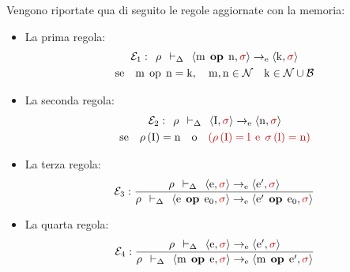 \documentclass[a4paper]{article}
\begin{document}
 	Vengono riportate qua di seguito le regole aggiornate con la memoria:
 	\begin{itemize}
 		\item La prima regola:
 		\begin{gather*}
 			\mathcal{E}_{1}: \:\: \rho \:\: \vdash_{\Delta} \:\: \left\langle \mathrm{m} \:\: \mathbf{op} \:\: \mathrm{n}, \textcolor{Red3}{\sigma} \right\rangle \rightarrow_{\mathrm{e}} \left\langle \mathrm{k}, \textcolor{Red3}{\sigma} \right\rangle \\
 			\mathrm{se} \hspace{1em} \mathrm{m} \:\: \mathrm{op} \:\: \mathrm{n} = \mathrm{k}, \hspace{1em} \mathrm{m,n} \in \mathcal{N} \hspace{1em} \mathrm{k} \in \mathcal{N} \cup \mathcal{B}
 		\end{gather*}
 		
 		\item La seconda regola:
 		\begin{gather*}
 			\mathcal{E}_{2} : \:\: \rho \:\: \vdash_{\Delta} \:\: \left\langle \mathrm{I}, \textcolor{Red3}{\sigma} \right\rangle \rightarrow_{\mathrm{e}} \left\langle \mathrm{n}, \textcolor{Red3}{\sigma} \right\rangle \\
 			\mathrm{se} \hspace{1em} \rho\left(\mathrm{I}\right) = \mathrm{n} \hspace{1em} \mathrm{o} \hspace{1em} \textcolor{Red3}{\left(\rho\left(\mathrm{I}\right) = \mathrm{l} \:\: \mathrm{e} \:\: \sigma\left(\mathrm{l}\right) = \mathrm{n}\right)}
 		\end{gather*}
 		
 		\item La terza regola:
 		\begin{equation*}
 			\mathcal{E}_{3} : \dfrac{
 				\rho \:\: \vdash_{\Delta} \:\: \left\langle \mathrm{e}, \textcolor{Red3}{\sigma} \right\rangle \rightarrow_{\mathrm{e}} \left\langle \mathrm{e}', \textcolor{Red3}{\sigma} \right\rangle
 			}{
 				\rho \:\: \vdash_{\Delta} \:\: \left\langle \mathrm{e} \:\: \mathbf{op} \:\: \mathrm{e}_{0}, \textcolor{Red3}{\sigma} \right\rangle \rightarrow_{\mathrm{e}} \left\langle \mathrm{e}' \:\: \mathbf{op} \:\: \mathrm{e}_{0}, \textcolor{Red3}{\sigma} \right\rangle
 			}
 		\end{equation*}
 		
 		\item La quarta regola:
 		\begin{equation*}
 			\mathcal{E}_{4} : \dfrac{
 				\rho \:\: \vdash_{\Delta} \:\: \left\langle \mathrm{e}, \textcolor{Red3}{\sigma} \right\rangle \rightarrow_{\mathrm{e}} \left\langle \mathrm{e}', \textcolor{Red3}{\sigma} \right\rangle
 			}{
 				\rho \:\: \vdash_{\Delta} \:\: \left\langle \mathrm{m} \:\: \mathbf{op} \:\: \mathrm{e}, \textcolor{Red3}{\sigma} \right\rangle \rightarrow_{\mathrm{e}} \left\langle \mathrm{m} \:\: \mathbf{op} \:\: \mathrm{e}', \textcolor{Red3}{\sigma} \right\rangle
 			}
 		\end{equation*}
 		

\end{itemize}
\end{document}
